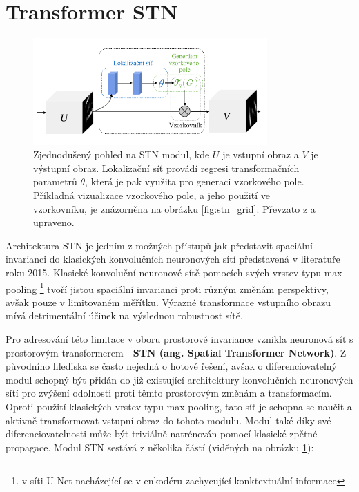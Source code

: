 \section{Transformer STN}
\label{sec:Chapter28}

\begin{figure}[ht]
\centering
\includegraphics[width=0.8\textwidth,keepaspectratio]{Figures/stn/stn_module.pdf}
\caption[Zjednodušený pohled na STN modul]
{Zjednodušený pohled na STN modul, kde $U$ je vstupní obraz a $V$ je výstupní obraz. Lokalizační síť provádí regresi transformačních parametrů $\theta$, která je pak využita pro generaci vzorkového pole. Příkladná vizualizace vzorkového pole, a jeho použití ve vzorkovníku, je znázorněna na obrázku \ref{fig:stn_grid}. Převzato z \cite{stn} a upraveno. }
\label{fig:stn_overview}
\end{figure}

Architektura STN je jedním z možných přístupů jak představit spaciální invarianci do klasických konvolučních neuronových sítí představená v literatuře \cite{stn} roku 2015. Klasické konvoluční neuronové sítě pomocích svých vrstev typu max pooling \footnote{v síti U-Net nacházející se v enkodéru zachycující konktextuální informace} tvoří jistou spaciální invarianci proti různým změnám perspektivy, avšak pouze v limitovaném měřítku. Výrazné transformace vstupního obrazu mívá detrimentální účinek na výslednou robustnost sítě.

Pro adresování této limitace v oboru prostorové invariance vznikla neuronová síť s prostorovým transformerem - \textbf{STN (ang. Spatial Transformer Network)}. Z původního hlediska se často nejedná o hotové řešení, avšak o diferenciovatelný modul schopný být přidán do již existující architektury konvolučních neuronových sítí pro zvýšení odolnosti proti těmto prostorovým změnám a transformacím. Oproti použití klasických vrstev typu max pooling, tato síť je schopna se naučit a aktivně transformovat vstupní obraz do tohoto modulu. Modul také díky své diferenciovatelnosti může být triviálně natrénován pomocí klasické zpětné propagace. Modul STN sestává z několika částí (viděných na obrázku \ref{fig:stn_overview}):

